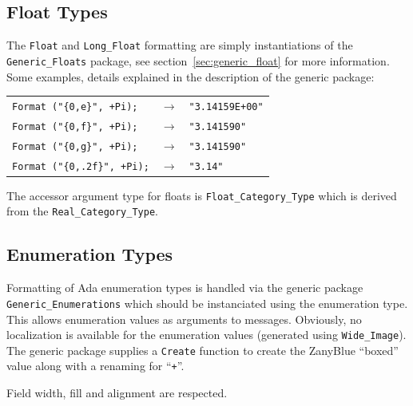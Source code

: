 \subsection{Float Types}

The \verb|Float| and \verb|Long_Float| formatting are simply instantiations
of the \verb|Generic_Floats| package, see section~\ref{sec:generic_float}
for more information.  Some examples, details explained in the description of
the generic package:
\begin{center}
\begin{tabular}{lll}
\verb|Format ("{0,e}", +Pi);| & $\rightarrow$ & \verb|"3.14159E+00"|\\
\verb|Format ("{0,f}", +Pi);| & $\rightarrow$ & \verb|"3.141590"|\\
\verb|Format ("{0,g}", +Pi);| & $\rightarrow$ & \verb|"3.141590"|\\
\verb|Format ("{0,.2f}", +Pi);| & $\rightarrow$ & \verb|"3.14"|
\end{tabular}
\end{center}
The accessor argument type for floats is \texttt{Float\_Category\_Type}
which is derived from the \texttt{Real\_Category\_Type}.

\subsection{Enumeration Types}

Formatting of Ada enumeration types is handled via the generic package
\verb|Generic_Enumerations| which should be instanciated using the enumeration
type.  This allows enumeration values as arguments to messages.  Obviously,
no localization is available for the enumeration values (generated using
\verb|Wide_Image|).  The generic package supplies a \verb|Create| function
to create the ZanyBlue ``boxed'' value along with a renaming for ``\verb|+|''.

Field width, fill and alignment are respected.

